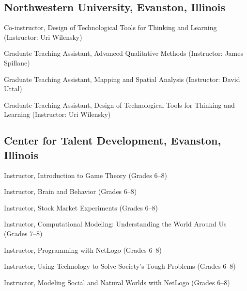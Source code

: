 \documentclass[11pt,letterpaper]{report} %
\begin{document}
    \subsection*{Northwestern University, Evanston, Illinois}

    \begin{tablist}

        \item[2026] \tab{}Co-instructor, Design of Technological Tools for Thinking and Learning (Instructor: Uri Wilensky)

        \item[2021] \tab{}Graduate Teaching Assistant, Advanced Qualitative Methods (Instructor: James Spillane)

        \item[2021] \tab{}Graduate Teaching Assistant, Mapping and Spatial Analysis (Instructor: David Uttal)

        \item[2017--19] \tab{}Graduate Teaching Assistant, Design of Technological Tools for Thinking and Learning (Instructor: Uri Wilensky)

    \end{tablist}

    \subsection*{Center for Talent Development, Evanston, Illinois}

    \begin{tablist}

        \item[2026] \tab{}Instructor, Introduction to Game Theory (Grades 6--8)
        
        \item[2025] \tab{}Instructor, Brain and Behavior (Grades 6--8)

        \item[2025] \tab{}Instructor, Stock Market Experiments (Grades 6--8)

        \item[2020] \tab{}Instructor, Computational Modeling: Understanding the World Around Us (Grades 7--8)

        \item[2018] \tab{}Instructor, Programming with NetLogo (Grades 6--8)

        \item[2018] \tab{}Instructor, Using Technology to Solve Society's Tough Problems (Grades 6--8)

        \item[2016] \tab{}Instructor, Modeling Social and Natural Worlds with NetLogo (Grades 6--8)

    \end{tablist}
\end{document}
